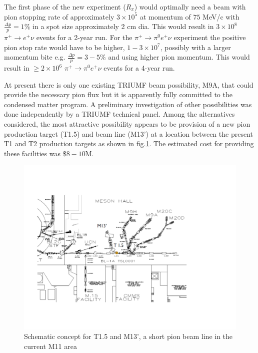 


 The first phase of the new experiment ($R_\pi$) would optimally need a beam with pion stopping rate of approximately $3\times 10^5$
  at momentum of $75$ MeV/c with $\frac{\Delta p}{p}=1\%$
in  a spot size  approximately 2 cm dia. This would result in $3\times 10^8$ $\pi^+\to e^+ \nu$ events for a 2-year run. For the $\pi^+ \to \pi^0 e^+ \nu$ experiment the  positive pion stop rate would have to be higher, $1-3\times 10^7$, possibly with  a larger momentum bite e.g. $\frac{\Delta p}{p}=3-5\%$ and using higher pion momentum. This would result in $\geq2\times 10^6$ $\pi^+ \to \pi^0 e^+ \nu$ events for a 4-year run. 

 At present there is only one existing TRIUMF beam possibility, M9A,  that could provide the necessary pion flux but it is apparently fully committed to the condensed matter program. A preliminary investigation of other possibilities was done independently by a TRIUMF technical panel\cite{PIBEAM}. Among the alternatives considered, the most attractive possibility appears to be provision of  a new pion production target (T1.5) and beam line (M13') at a location between the present T1 and T2 production targets as shown in fig.\ref{fig:T1A}. The estimated cost for providing these facilities was $\$8-10$M.
 
\begin{figure}[h!]
\centering
\vspace{-20mm}
\includegraphics[scale=0.6]{sections/figures/T1.5M13'.pdf}
\vspace{-15mm}
\caption{Schematic concept for T1.5 and M13’, a short pion beam line in the current M11 area\cite{PIBEAM}}
\label{fig:T1A}
\end{figure}

